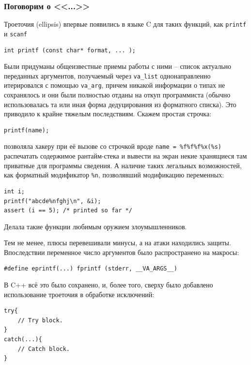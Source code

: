 \documentclass[a4paper,12pt,oneside]{article}
\renewcommand{\texttt}[2][black]{\textcolor{#1}{\ttfamily #2}}
\begin{document}
\subsubsection{Поговорим о <<\texttt{...}>>}

Троеточия (ellipsis) впервые появились в языке C для таких функций, как \lstinline!printf! и \lstinline!scanf! 

\begin{lstlisting}
int printf (const char* format, ... );
\end{lstlisting}

Были придуманы общеизвестные приемы работы с ними -- список актуально переданных аргументов, получаемый через \lstinline!va_list! однонаправленно итерировался с помощью \lstinline!va_arg!, причем никакой информации о типах не сохранялось и они были полностью отданы на откуп программиста (обычно использовалась та или иная форма дедуцирования из форматного списка). Это приводило к крайне тяжелым последствиям. Скажем простая строчка:

\begin{lstlisting}
printf(name);
\end{lstlisting}

позволяла хакеру при её вызове со строчкой вроде \lstinline!name = %f%f%f%x(%s)! распечатать содержимое рантайм-стека и вывести на экран некие хранящиеся там приватные для программы сведения. А наличие таких легальных возможностей, как форматный модификатор \lstinline!%n!, позволявший модификацию переменных:

\begin{lstlisting}
int i;
printf("abcde%nfghj\n", &i);
assert (i == 5); /* printed so far */
\end{lstlisting}

Делала такие функции любимым оружием злоумышленников. 

Тем не менее, плюсы перевешивали минусы, а на атаки находились защиты. Впоследствии переменное число аргументов было распространено на макросы:

\begin{lstlisting}
#define eprintf(...) fprintf (stderr, __VA_ARGS__)
\end{lstlisting}

В C++ всё это было сохранено, и, более того, сверху было добавлено использование троеточия в обработке исключений:

\begin{lstlisting}
try{
    // Try block.
}
catch(...){
    // Catch block.
}
\end{lstlisting}
\end{document}
